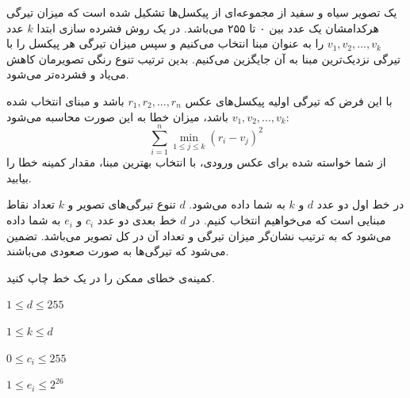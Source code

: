\documentclass[11.5pt,a4paper,oneside]{article}
\begin{document}
\def\problemCode{Compression}
\def\problemEnglishTitle{Image Compression}
\def\problemFarsiTitle{فشرده‌سازی تصویر}
\def\timeLimit{$2$ \second}
\def\memLimit{$256$ \megabytes}
\begin{problem}
یک تصویر سیاه و سفید از مجموعه‌ای از پیکسل‌ها تشکیل شده است که میزان تیرگی هرکدامشان یک عدد بین ۰ تا ۲۵۵ می‌باشد. در یک روش فشرده سازی ابتدا $k$ عدد
$v_1, v_2, ..., v_k$
را به عنوان مبنا انتخاب می‌کنیم و سپس میزان تیرگی هر پیکسل را با تیرگی نزدیک‌ترین مبنا به آن جایگزین می‌کنیم. بدین ترتیب تنوع رنگی تصویرمان کاهش می‌یاد و فشرده‌تر می‌شود. 

با این فرض که تیرگی اولیه پیکسل‌های عکس
$r_1, r_2, ..., r_n$
باشد و مبنای انتخاب شده $v_1, v_2, ..., v_k$ باشد، میزان خطا به این صورت محاسبه می‌شود:
$$ \sum _{i=1}^ n \min _{1\leq j \leq k} (r_ i - v_ j)^2$$
از شما خواسته شده برای عکس ورودی، با انتخاب بهترین مبنا، مقدار کمینه خطا را بیابید.

در خط اول دو عدد $d$ و $k$ به شما داده می‌شود. $d$ تنوع تیرگی‌های تصویر و $k$ تعداد نقاط مبنایی است که می‌خواهیم انتخاب کنیم. در $d$
خط بعدی دو عدد $c_i$ و $e_i$
به شما داده می‌شود که به ترتیب نشان‌گر میزان تیرگی و تعداد آن در کل تصویر می‌باشد. تضمین می‌شود که تیرگی‌ها به صورت صعودی می‌باشند. 

\outputDescription
کمینه‌ی خطای ممکن را در یک خط چاپ کنید.

\constraints
\begin{shortitems}
	\item $1 \le d \le 255$
	\item $1 \le k \le d$
	\item $0 \le c_i \le 255$
	\item $1 \le e_i \le 2^{26}$
\end{shortitems}

\begin{example}
%
%
%
\end{example}

\end{problem}
\end{document}
